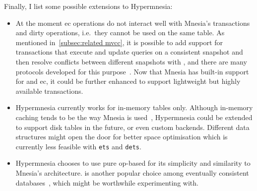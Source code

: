 Finally, I list some possible extensions to Hypermnesia:

\begin{itemize}
  \item At the moment \acrshort{ec} operations do not interact well with Mnesia's
  transactions and dirty operations, i.e.\ they cannot be used on the same table.
  As mentioned in~\cref{subsec:related mvcc}, it is possible to add support for
  transactions that execute and update queries on a
  consistent snapshot and then resolve conflicts between different snapshots
  with , and there are many protocols developed for this 
  purpose~\cite{preguica2014SwiftCloud,shapiro2018Antidote}.
  Now that Mnesia has built-in support for  and \acrlong{ec},
  it could be further enhanced to support lightweight but highly available
  transactions.
  \item Hypermnesia currently works for in-memory tables only. Although in-memory 
  caching tends to be the way Mnesia is used~\cite{mattsson1998mnesia},
  Hypermnesia could be extended to support disk tables in the future, or even 
  custom backends. Different data structures might open the door 
  for better space optimisation which is currently less feasible 
  with \texttt{ets} and \texttt{dets}.
  \item Hypermnesia chooses to use pure op-based  for its simplicity
  and similarity to Mnesia's architecture.  is another popular
  choice among eventually consistent databases~\cite{klophaus2010Riak}, which might
  be worthwhile experimenting with. 
\end{itemize}

